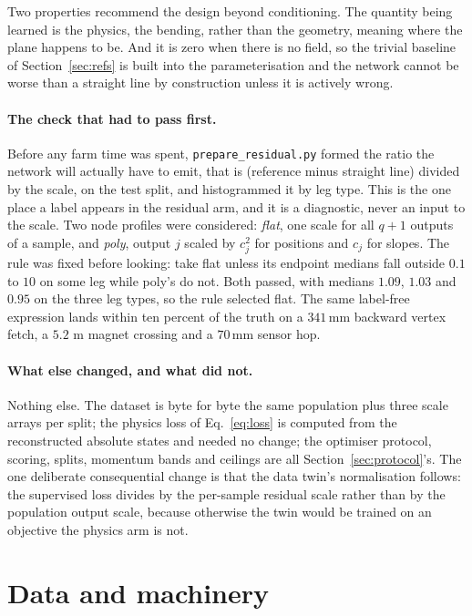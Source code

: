 \documentclass[11pt,a4paper]{article}
\newcommand{\mm}{\ensuremath{\,\mathrm{mm}}}
\begin{document}
Two properties recommend the design beyond conditioning. The quantity being
learned is the physics, the bending, rather than the geometry, meaning where the
plane happens to be. And it is zero when there is no field, so the trivial
baseline of Section~\ref{sec:refs} is built into the parameterisation and the
network cannot be worse than a straight line by construction unless it is
actively wrong.

\paragraph{The check that had to pass first.}
Before any farm time was spent, \texttt{prepare\_residual.py} formed the ratio
the network will actually have to emit, that is (reference minus straight line)
divided by the scale, on the test split, and histogrammed it by leg type. This
is the one place a label appears in the residual arm, and it is a diagnostic,
never an input to the scale. Two node profiles were considered: \emph{flat}, one
scale for all $q+1$ outputs of a sample, and \emph{poly}, output $j$ scaled by
$c_j^2$ for positions and $c_j$ for slopes. The rule was fixed before looking:
take flat unless its endpoint medians fall outside $0.1$ to $10$ on some leg
while poly's do not. Both passed, with medians $1.09$, $1.03$ and $0.95$ on the
three leg types, so the rule selected flat. The same label-free expression lands
within ten percent of the truth on a $341\mm$ backward vertex fetch, a $5.2$ m
magnet crossing and a $70\mm$ sensor hop.

\paragraph{What else changed, and what did not.}
Nothing else. The dataset is byte for byte the same population plus three scale
arrays per split; the physics loss of Eq.~\eqref{eq:loss} is computed from the
reconstructed absolute states and needed no change; the optimiser protocol,
scoring, splits, momentum bands and ceilings are all Section~\ref{sec:protocol}'s.
The one deliberate consequential change is that the data twin's normalisation
follows: the supervised loss divides by the per-sample residual scale rather
than by the population output scale, because otherwise the twin would be trained
on an objective the physics arm is not.

\section{Data and machinery}
\label{sec:data}
\end{document}
